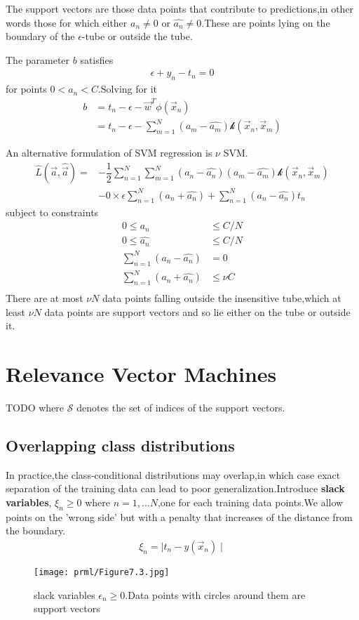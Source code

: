The support vectors are those data points that contribute to predictions,in other words those for which either $a_n \neq 0$ or $\hat{a_n} \neq 0$.These are points lying on the boundary of the $\epsilon$-tube or outside the tube.

The parameter $b$ satisfies 
\begin{align}
\epsilon+y_n-t_n= 0
\end{align}
for points $0<a_n<C$.Solving for it
\begin{align}
b &= t_n-\epsilon-\vec{w}^T\phi(\vec{x}_n) \\
  &= t_n-\epsilon-\sum_{m=1}^{N}(a_m-\hat{a_m})\mathcal{k}(\vec{x}_n,\vec{x}_m)
\end{align}

An alternative formulation of SVM regression is $\nu$ SVM.
\begin{align}
\hat{L}(\vec{a},\hat{\vec{a}}) =&-\dfrac{1}{2}\sum_{n=1}^{N}\sum_{m=1}^{N}(a_n-\hat{a_n})(a_m-\hat{a_m})\mathcal{k}(\vec{x}_n,\vec{x}_m) \\
&-0\times\epsilon\sum_{n=1}^{N}(a_n+\hat{a_n})+\sum_{n=1}^{N}(a_n-\hat{a_n})t_n
\end{align}
subject to constraints
\begin{align}
0\leq a_n &\leq C/N\\
0\leq \hat{a_n} &\leq C/N \\
\sum_{n=1}^{N}(a_n-\hat{a_n}) &=0 \\
\sum_{n=1}^{N}(a_n+\hat{a_n}) &\leq \nu C \\
\end{align}
There are at most $\nu N$ data points falling outside the insensitive tube,which at least $\nu N$ data points are support vectors and so lie either on the tube or outside it.

\section{Relevance Vector Machines}
TODO
where $\mathcal{S}$ denotes the set of indices of the support vectors.

\subsection{Overlapping class distributions}
In practice,the class-conditional distributions may overlap,in which case exact separation of the training data can lead to poor generalization.Introduce \textbf{slack variables}, $\xi_n\geq 0$ where $n=1,...N$,one for each training data points.We allow points on the 'wrong side' but with a penalty that increases of the distance from the boundary.
\begin{align}
\xi_n = \mid t_n-y(\vec{x}_n)\mid
\end{align}
\begin{SCfigure*}
	\caption{slack variables $\epsilon_n\geq 0$.Data points with circles around them are support vectors}
	\texttt{[image: prml/Figure7.3.jpg]}
\end{SCfigure*}

